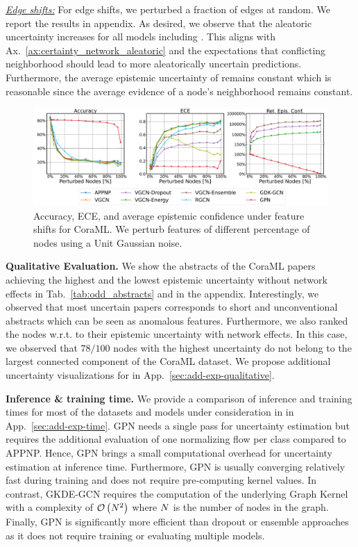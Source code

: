 \textit{\underline{Edge shifts:}} For edge shifts, we perturbed a fraction of edges at random. We report the results in appendix. As desired, we observe that the aleatoric uncertainty increases for all models including \oursacro{}. This aligns with Ax.~\ref{ax:certainty_network_aleatoric} and the expectations that conflicting neighborhood should lead to more aleatorically uncertain predictions. Furthermore, the average epistemic uncertainty of \oursacro{} remains constant which is reasonable since the average evidence of a node's neighborhood remains constant.

%
\begin{figure}[!h]
    \centering
    \includegraphics[width=\textwidth]{resources/CoraML-normal-shift.pdf}
    \caption{Accuracy, ECE, and average epistemic confidence under feature shifts for CoraML. We perturb features of different percentage of nodes using a Unit Gaussian noise.}
    \label{fig:shifts-normal-cora}
\end{figure}
%

\textbf{Qualitative Evaluation.} We show the abstracts of the CoraML papers achieving the highest and the lowest epistemic uncertainty without network effects in Tab.~\ref{tab:odd_abstracts} and in the appendix. Interestingly, we observed that most uncertain papers corresponds to short and unconventional abstracts which can be seen as anomalous features. Furthermore, we also ranked the nodes w.r.t. to their epistemic uncertainty with network effects. In this case, we observed that $78/100$ nodes with the highest uncertainty do not belong to the largest connected component of the CoraML dataset. We propose additional uncertainty visualizations for \oursacro{} in App.~\ref{sec:add-exp-qualitative}. 

\textbf{Inference \& training time.} We provide a comparison of inference and training times for most of the datasets and models under consideration in in App.~\ref{sec:add-exp-time}. GPN needs a single pass for uncertainty estimation but requires the additional evaluation of one normalizing flow per class compared to APPNP. Hence, GPN brings a small computational overhead for uncertainty estimation at inference time. Furthermore, GPN is usually converging relatively fast during training and does not require pre-computing kernel values. In contrast, GKDE-GCN \citep{Zhao2020} requires the computation of the underlying Graph Kernel with a complexity of $\mathcal{O}\left(N^2\right)$ where $N$ is the number of nodes in the graph. Finally, GPN is significantly more efficient than dropout or ensemble approaches as it does not require training or evaluating multiple models.


